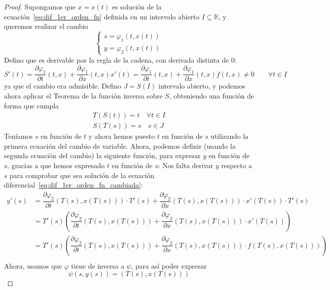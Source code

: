\begin{teo}
\begin{proof}
    Supongamos que $x=x(t)$ es solución de la ecuación~\ref{eq:dif_1er_orden_fn} definida en un intervalo abierto $I\subseteq \mathbb{R}$, y queremos realizar el cambio
    \begin{equation*}
        \left\{\begin{array}{rl}
            s = \varphi_1(t,x(t)) \\
            y = \varphi_2(t,x(t))
        \end{array}\right.
    \end{equation*}
    Defino
    que es derivable por la regla de la cadena, con derivada distinta de 0:
    \begin{equation*}
        S'(t) = \dfrac{\partial\varphi_1}{\partial t}(t,x) + \dfrac{\partial\varphi_1}{\partial x}(t,x)x'(t) = \dfrac{\partial\varphi_1}{\partial t}(t,x) + \dfrac{\partial\varphi_1}{\partial x}(t,x)f(t,x) \neq 0 \qquad \forall t\in I
    \end{equation*}
    ya que el cambio era admisible. Defino $J=S(I)$ intervalo abierto, y podemos ahora aplicar el Teorema de la función inversa sobre $S$, obteniendo una función
    de forma que cumpla
    \begin{gather*}
        T(S(t)) = t \quad \forall t\in I \\
        S(T(s)) = s \quad s\in J
    \end{gather*}
    Teníamos $s$ en función de $t$ y ahora hemos puesto $t$ en función de $s$ utilizando la primera ecuación del cambio de variable. Ahora, podemos definir (usando la segunda ecuación del cambio) la siguiente función, para expresar $y$ en función de $s$, gracias a que hemos expresado $t$ en función de $s$:
    Nos falta derivar $y$ respecto a $s$ para comprobar que sea solución de la ecuación diferencial~\ref{eq:dif_1er_orden_fn_cambiada}:
    \begin{align*}
        y'(s) &= \dfrac{\partial\varphi_2}{\partial t}(T(s),x(T(s)))\cdot T'(s) + \dfrac{\partial \varphi_2}{\partial x}(T(s),x(T(s)))\cdot x'(T(s))\cdot T'(s) \\
              &= T'(s) \left(\dfrac{\partial\varphi_2}{\partial t}(T(s),x(T(s)))+ \dfrac{\partial \varphi_2}{\partial x}(T(s),x(T(s)))\cdot x'(T(s))\right) \\
              &= T'(s) \left(\dfrac{\partial\varphi_2}{\partial t}(T(s),x(T(s)))+ \dfrac{\partial \varphi_2}{\partial x}(T(s),x(T(s)))\cdot f(T(s),x(T(s)))\right) \\
    \end{align*}
    Ahora, usamos que $\varphi$ tiene de inversa a $\psi$, para así poder expresar
    \begin{equation*}
        \psi(s,y(s)) = (T(s), x(T(s)))
    \end{equation*}


\end{proof}
\end{teo}
